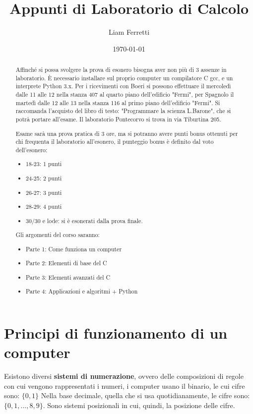\documentclass[a4paper,12pt]{article}
\title{Appunti di Laboratorio di Calcolo}
\author{Liam Ferretti}
\date{\today}
\begin{document}
	
	\maketitle
	
	\begin{abstract}
		Affinché si possa svolgere la prova di esonero bisogna aver non più di 3 assenze in laboratorio.
		È necessario installare sul proprio computer un compilatore C gcc, e un interprete Python 3.x.
		Per i ricevimenti con Boeri si possono effettuare il mercoledì dalle 11 alle 12 nella stanza 407 al quarto piano dell'edificio "Fermi", per Spagnolo il martedì dalle 12 alle 13 nella stanza 116 al primo piano dell'edificio "Fermi".
		Si raccomanda l'acquisto del libro di testo: "Programmare la scienza L.Barone", che si potrà portare all'esame.
		Il laboratorio Pontecorvo si trova in via Tiburtina 205.
		
		Esame sarà una prova pratica di 3 ore, ma si potranno avere punti bonus ottenuti per chi frequenta il laboratorio all'esonero, il punteggio bonus è definito dal voto dell'esonero:
		\begin{itemize}
			\item 18-23: 1 punti
			\item 24-25: 2 punti
			\item 26-27: 3 punti
			\item 28-29: 4 punti
			\item 30/30 e lode: si è esonerati dalla prova finale.
		\end{itemize}
		Gli argomenti del corso saranno:
		\begin{itemize}
			\item Parte 1: Come funziona un computer
			\item Parte 2: Elementi di base del C
			\item Parte 3: Elementi avanzati del C
			\item Parte 4: Applicazioni e algoritmi + Python
		\end{itemize}
	\end{abstract}
	
	\newpage
	\tableofcontents
	\clearpage
	
	\section{Principi di funzionamento di un computer}
	Esistono diversi \textbf{sistemi di numerazione}, ovvero delle composizioni di regole con cui vengono rappresentati i numeri, i computer usano il binario, le cui cifre sono: $\{0, 1\}$
	Nella base decimale, quella che si usa quotidianamente, le cifre sono: $\{0, 1, ..., 8, 9\}$.
	Sono sistemi posizionali in cui, quindi, la posizione delle cifre.
	
\end{document}

